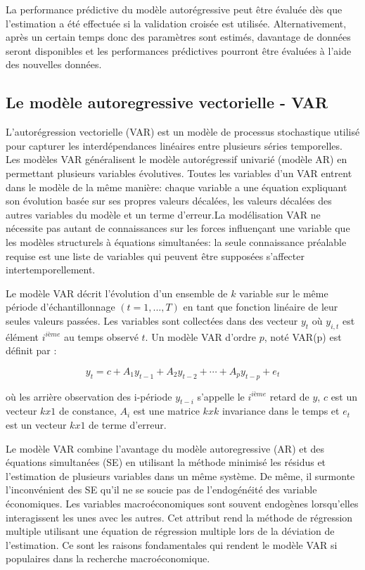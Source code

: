 La performance prédictive du modèle autorégressive peut être évaluée dès que l’estimation a été effectuée si la validation croisée est utilisée. Alternativement, après un certain temps donc des paramètres sont estimés, davantage de données seront disponibles et les performances prédictives pourront être évaluées à l'aide des nouvelles données.
 
\subsection{Le modèle autoregressive vectorielle - VAR}
L’autorégression vectorielle (VAR) est un modèle de processus stochastique utilisé pour capturer les interdépendances linéaires entre plusieurs séries temporelles. Les modèles VAR généralisent le modèle autorégressif univarié (modèle AR) en permettant plusieurs variables évolutives. Toutes les variables d'un VAR entrent dans le modèle de la même manière: chaque variable a une équation expliquant son évolution basée sur ses propres valeurs décalées, les valeurs décalées des autres variables du modèle et un terme d'erreur.La modélisation VAR ne nécessite pas autant de connaissances sur les forces influençant une variable que les modèles structurels à équations simultanées: la seule connaissance préalable requise est une liste de variables qui peuvent être supposées s’affecter intertemporellement. 

Le modèle VAR décrit l'évolution d'un ensemble de $k$ variable sur le même période d'échantillonnage $(t = 1,..., T)$ en tant que fonction linéaire de leur seules valeurs passées.  Les variables sont collectées dans des vecteur $y_t$ où $y_{i,t}$ est élément $i^{ième}$ au temps  observé $t$. Un modèle VAR d'ordre $p$, noté VAR(p) est définit par : 

$$y_t = c + A_{1}y_{t-1} + A_{2}y_{t-2} + \cdots + A_{p}y_{t-p} + e_t $$

où les arrière observation des i-période $y_{t-i}$ s'appelle le $i^{ième}$ retard de $y$, $c$ est un vecteur $k x 1$ de constance, $A_i$ est une matrice $k x k$ invariance dans le temps et $e_t$ est un vecteur $k x 1$ de terme d'erreur.

Le modèle VAR combine l'avantage du modèle autoregressive (AR) et des équations simultanées (SE)  en utilisant  la méthode minimisé les résidus et l'estimation de plusieurs variables dans un même système. De même, il surmonte l'inconvénient des SE qu'il ne se soucie pas de l'endogénéité des variable économiques. Les variables macroéconomiques sont souvent endogènes lorsqu'elles interagissent les unes avec les autres. Cet attribut rend la méthode de régression multiple utilisant une équation de régression multiple lors de la déviation de l'estimation. Ce sont les raisons fondamentales qui rendent le modèle VAR si populaires dans la recherche macroéconomique.

